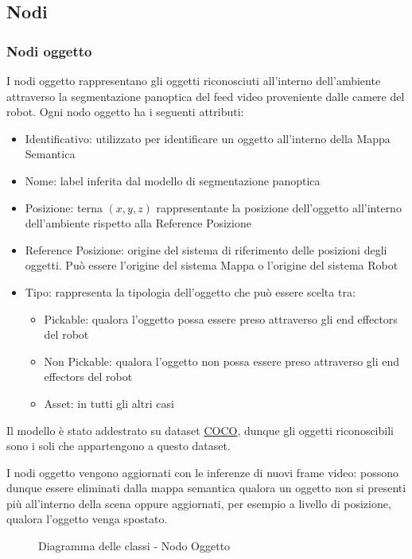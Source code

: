 \subsection{Nodi}
\subsubsection{Nodi oggetto}

I nodi oggetto rappresentano gli oggetti riconosciuti all'interno dell'ambiente attraverso la segmentazione panoptica del feed video proveniente dalle camere del robot. Ogni nodo oggetto ha i seguenti attributi:
\begin{itemize}
  \item Identificativo: utilizzato per identificare un oggetto all'interno della Mappa Semantica
  \item Nome: label inferita dal modello di segmentazione panoptica
  \item Posizione: terna $(x, y, z)$ rappresentante la posizione dell'oggetto all'interno dell'ambiente rispetto alla Reference Posizione
  \item Reference Posizione: origine del sistema di riferimento delle posizioni degli oggetti. Può essere l'origine del sistema Mappa o l'origine del sistema Robot
  \item Tipo: rappresenta la tipologia dell'oggetto che può essere scelta tra:
  \begin{itemize}
    \item Pickable: qualora l'oggetto possa essere preso attraverso gli end effectors del robot
    \item Non Pickable: qualora l'oggetto non possa essere preso attraverso gli end effectors del robot
    \item Asset: in tutti gli altri casi
  \end{itemize}
\end{itemize}
Il modello è stato addestrato su dataset \href{https://cocodataset.org/}{COCO}, dunque gli oggetti riconoscibili sono i soli che appartengono a questo dataset.

I nodi oggetto vengono aggiornati con le inferenze di nuovi frame video: possono dunque essere eliminati dalla mappa semantica qualora un oggetto non si presenti più all'interno della scena oppure aggiornati, per esempio a livello di posizione, qualora l'oggetto venga spostato.

\begin{figure}[h]
  \centering
  \caption{Diagramma delle classi - Nodo Oggetto}
\end{figure}

